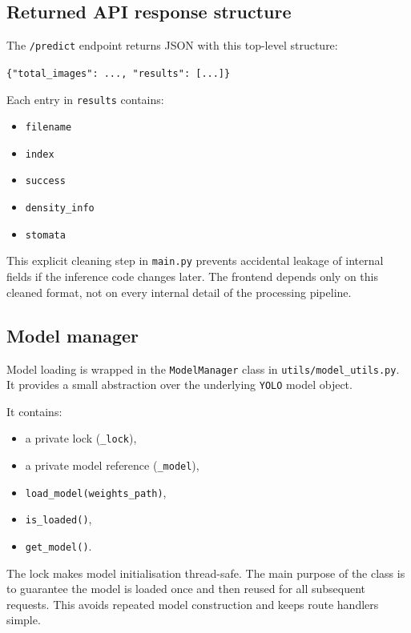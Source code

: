 \documentclass{article}
\begin{document}
\subsection{Returned API response structure}

The \texttt{/predict} endpoint returns JSON with this top-level structure:

\begin{center}
\texttt{\{"total\_images": ..., "results": [...]\}}
\end{center}

Each entry in \texttt{results} contains:

\begin{itemize}
    \item \texttt{filename}
    \item \texttt{index}
    \item \texttt{success}
    \item \texttt{density\_info}
    \item \texttt{stomata}
\end{itemize}

This explicit cleaning step in \texttt{main.py} prevents accidental leakage of internal fields if the inference code changes later. The frontend depends only on this cleaned format, not on every internal detail of the processing pipeline.

\subsection{Model manager}

Model loading is wrapped in the \texttt{ModelManager} class in \texttt{utils/model\_utils.py}. It provides a small abstraction over the underlying \texttt{YOLO} model object.

It contains:

\begin{itemize}
    \item a private lock (\texttt{\_lock}),
    \item a private model reference (\texttt{\_model}),
    \item \texttt{load\_model(weights\_path)},
    \item \texttt{is\_loaded()},
    \item \texttt{get\_model()}.
\end{itemize}

The lock makes model initialisation thread-safe. The main purpose of the class is to guarantee the model is loaded once and then reused for all subsequent requests. This avoids repeated model construction and keeps route handlers simple.
\end{document}
